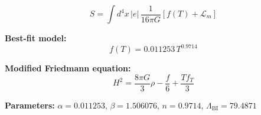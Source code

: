 
\begin{equation}
  S = \int d^4x \, |e| \, \frac{1}{16\pi G} \left[ f(T) + \mathcal{L}_m \right]
\end{equation}

\textbf{Best-fit model:}
\begin{equation}
  f(T) = 0.011253 \, T^{0.9714}
\end{equation}

\textbf{Modified Friedmann equation:}
\begin{equation}
  H^2 = \frac{8\pi G}{3} \rho - \frac{f}{6} + \frac{T f_T}{3}
\end{equation}

\textbf{Parameters:}
$\alpha = 0.011253$, \quad
$\beta = 1.506076$, \quad
$n = 0.9714$, \quad
$\Lambda_{\text{BI}} = 79.4871$